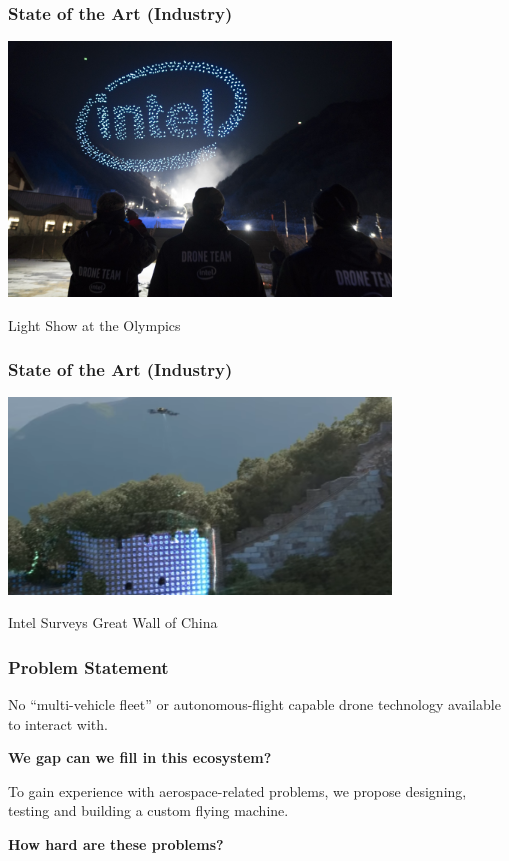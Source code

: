 \documentclass{beamer}
\begin{document}
\begin{frame}
\frametitle{State of the Art (Industry)}
\begin{center}
\includegraphics[width=4in]{../src/im/autonomous2}

Light Show at the Olympics
\end{center}
\end{frame}

\begin{frame}
\frametitle{State of the Art (Industry)}
\begin{center}
\includegraphics[width=4in]{../src/im/great_wall1}

Intel Surveys Great Wall of China
\end{center}
\end{frame}

\begin{frame}
\frametitle{Problem Statement}
\Large
No ``multi-vehicle fleet'' or autonomous-flight capable drone
technology available to interact with.
\break

\textbf{We gap can we fill in this ecosystem?}
\break

To gain experience with aerospace-related problems, we propose
designing, testing and building a custom flying machine.
\break

\textbf{How hard are these problems?}
\end{frame}
\end{document}
